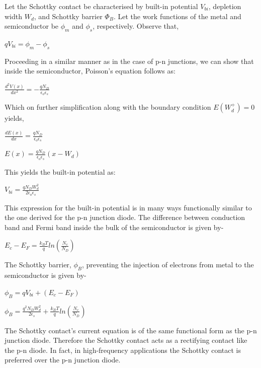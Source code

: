 \documentclass[12 pt]{article}
\begin{document}
Let the Schottky contact be characterised by built-in potential $V_{bi}$, depletion width $W_{d}$, and Schottky barrier $\Phi_{B}$. Let the work functions of the metal and semiconductor be $\phi_{m}$ and $\phi_{s}$, respectively. Observe that,
\begin{center}
    $qV_{bi} = \phi_{m} - \phi_{s}$
\end{center}
Proceeding in a similar manner as in the case of p-n junctions, we can show that inside the semiconductor, Poisson's equation follows as: \par
\begin{center}
    $ \frac{d^{2}V(x)}{dx^{2}} = -\frac{qN_{D}}{\epsilon_{o}\epsilon_{s}} $
\end{center}
Which on further simplification along with the boundary condition $E(W_{d}^{+}) = 0$ yields,
\begin{center}
    $ \frac{dE(x)}{dx} = \frac{qN_{D}}{\epsilon_{o}\epsilon_{s}} $
\end{center}
\begin{center}
    $ E(x) = \frac{qN_{D}}{\epsilon_{o}\epsilon_{s}}(x-W_{d}) $
\end{center}
This yields the built-in potential as: 
\begin{center}
    $ V_{bi} = \frac{qN_{D}W_{d}^{2}}{2\epsilon_{o}\epsilon_{s}} $
\end{center}
This expression for the built-in potential is in many ways functionally similar to the one derived for the p-n junction diode. The difference between conduction band and Fermi band inside the bulk of the semiconductor is given by- 
\begin{center}
    $ E_{c}-E_{F} = \frac{k_{B}T}{q}ln(\frac{N_{c}}{N_{D}})$
\end{center}
The Schottky barrier, $\phi_{B}$, preventing the injection of electrons from metal to the semiconductor is given by-
\begin{center}
    $ \phi_{B} = qV_{bi} + (E_{c}-E_{F}) $
\end{center}
\begin{center}
    $ \phi_{B} = \frac{q^{2}N_{D}W_{d}^{2}}{2\epsilon_{s}} + \frac{k_{B}T}{q}ln(\frac{N_{c}}{N_{D}}) $
\end{center}
The Schottky contact's current equation is of the same functional form as the p-n junction diode. Therefore the Schottky contact acts as a rectifying contact like the p-n diode. In fact, in high-frequency applications the Schottky contact is preferred over the p-n junction diode. \newline
\end{document}
